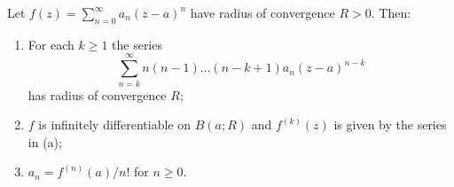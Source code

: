 Let $f(z) = \sum_{n=0}^{\infty} a_n (z - a)^n$ have radius of convergence $R > 0$. Then:

\begin{enumerate}
    \item[(a)] For each $k \geq 1$ the series
    $$\sum_{n=k}^{\infty} n(n-1)\ldots(n-k+1) a_n (z-a)^{n-k}$$
    has radius of convergence $R$;
    \item[(b)] $f$ is infinitely differentiable on $B(a; R)$ and $f^{(k)}(z)$ is given by the series in (a);
    \item[(c)] $a_n = f^{(n)}(a)/n!$ for $n \geq 0$.
\end{enumerate}
